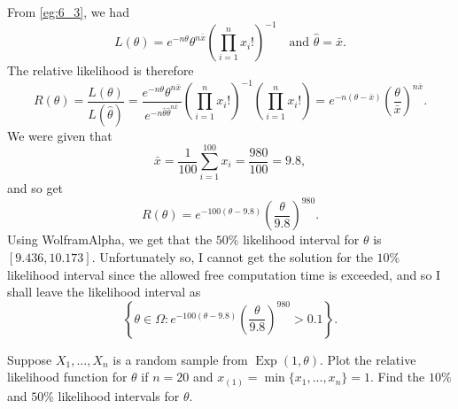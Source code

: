 \documentclass[notoc,notitlepage]{tufte-book}
\DeclareMathOperator{\Exp}{Exp }
\begin{document}
\begin{solution}
  From \cref{eg:6_3}, we had
  \begin{equation*}
    L(\theta) = e^{-n \theta} \theta^{n \bar{x}} \left( \prod_{i=1}^{n} x_i! \right)^{-1} \quad \text{and } \hat{\theta} = \bar{x}.
  \end{equation*}
  The relative likelihood is therefore
  \begin{equation*}
    R(\theta) = \frac{L(\theta)}{L(\hat{\theta})} = \frac{e^{-n \theta} \theta^{n \bar{x}}}{e^{-n \hat{\theta} \hat{\theta}^{n \bar{x}}}} \left( \prod_{i=1}^{n} x_i! \right)^{-1} \left( \prod_{i=1}^{n} x_i! \right) = e^{-n ( \theta - \bar{x} )} \left( \frac{\theta}{\bar{x}} \right)^{n \bar{x}}.
  \end{equation*}
  We were given that
  \begin{equation*}
    \bar{x} = \frac{1}{100} \sum_{i=1}^{100} x_i = \frac{980}{100} = 9.8,
  \end{equation*}
  and so get
  \begin{equation*}
    R(\theta) = e^{- 100 ( \theta - 9.8 )} \left( \frac{\theta}{9.8} \right)^{980}.
  \end{equation*}
  Using WolframAlpha, we get that the $50\%$ likelihood interval for $\theta$ is $[9.436, 10.173]$. Unfortunately so, I cannot get the solution for the $10\%$ likelihood interval since the allowed free computation time is exceeded, and so I shall leave the likelihood interval as
  \begin{equation*}
    \left\{ \theta \in \Omega : e^{-100(\theta - 9.8)}\left( \frac{\theta}{9.8} \right)^{980} > 0.1 \right\}.
  \end{equation*}
\end{solution}

\begin{eg}\label{eg:6_11}
  Suppose $X_1, ..., X_n$ is a random sample from $\Exp(1, \theta)$. Plot the relative likelihood function for $\theta$ if $n = 20$ and $x_{(1)} = \min\{x_1, ..., x_n\} = 1$. Find the $10\%$ and $50\%$ likelihood intervals for $\theta$.
\end{eg}
\end{document}
